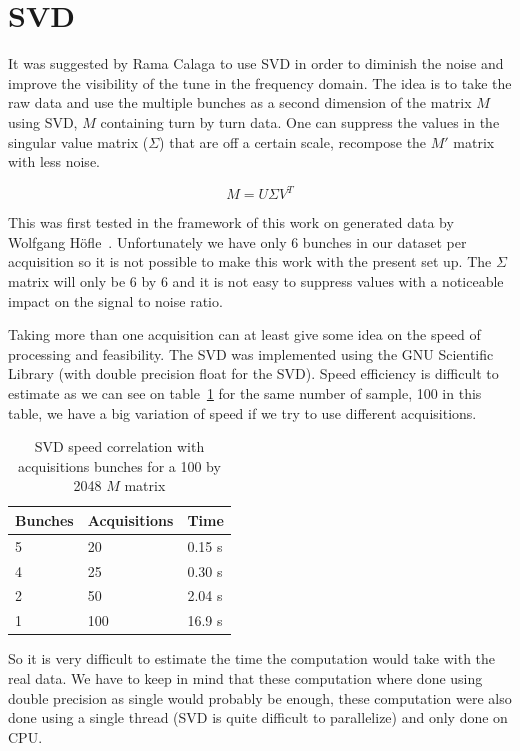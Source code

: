 \section{SVD}
\label{sec:SVD}

It was suggested by Rama Calaga to use \gls{SVD} in order to diminish the noise and improve the visibility of the tune in the frequency domain. The idea is to take the raw data and use the multiple bunches as a second dimension of the matrix $M$ using SVD, $M$ containing turn by turn data. One can suppress the values in the singular value matrix ($\Sigma$) that are off a certain scale, recompose the $M'$ matrix with less noise.

$$M = U \Sigma V^{T}$$ 

This was first tested in the framework of this work on generated data by Wolfgang H{\"o}f\/le~\cite{HofleEvian10}. Unfortunately we have only 6 bunches in our dataset per acquisition so it is not possible to make this work with the present set up. The $\Sigma$ matrix will only be 6 by 6 and it is not easy to suppress values with a noticeable impact on the signal to noise ratio.

Taking more than one acquisition can at least give some idea on the speed of processing and feasibility. The SVD was implemented using the GNU Scientific Library (with double precision float for the SVD). Speed efficiency is difficult to estimate as we can see on table~\ref{tab:SVD} for the same number of sample, 100 in this table, we have a big variation of speed if we try to use different acquisitions.

\begin{table}[H]
	\caption{SVD speed correlation with acquisitions bunches for a 100 by 2048 $M$ matrix}
	\label{tab:SVD}
	\centering
	\begin{tabular}{|l|l|l|}
		\hline
			Bunches & Acquisitions & Time \\
		\hline
			5 & 20 & 0.15 s \\
			4 & 25 & 0.30 s \\
			2 & 50 & 2.04 s \\
			1 & 100 & 16.9 s \\
		\hline
	\end{tabular}
\end{table}

So it is very difficult to estimate the time the computation would take with the real data. We have to keep in mind that these computation where done using double precision as single would probably be enough, these computation were also done using a single thread (SVD is quite difficult to parallelize) and only done on \gls{CPU}.

